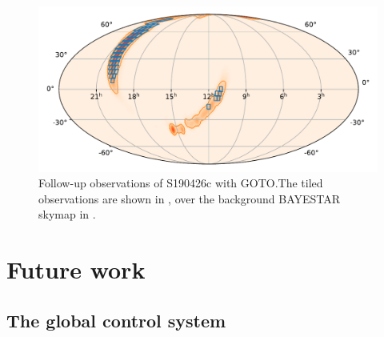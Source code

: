 \begin{colsection}
\begin{colsection}
\begin{figure}[p]
    \begin{center}
        \includegraphics[width=0.9\linewidth]{images/190426_goto.pdf}
    \end{center}
    \caption[Follow-up observations of S190426c with GOTO]{
        Follow-up observations of S190426c with GOTO.\@ The tiled observations are shown in , over the background BAYESTAR skymap in .
        }\label{fig:190426_goto}
\end{figure}

\clearpage

\end{colsection}


\end{colsection}


\newpage
\section{Future work}
\label{sec:future}
\begin{colsection}


\begin{colsection}

\citep{GW150914, GW150914_followup, GW151226}

\end{colsection}


\subsection{The global control system}
\label{sec:gtecs_multisite}
\begin{colsection}


\end{colsection}


\end{colsection}

